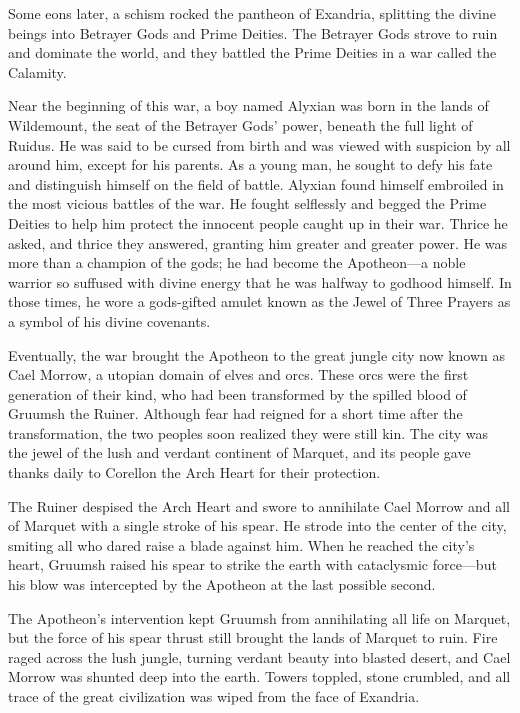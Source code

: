 \documentclass[10pt,a4paper,twoside,twocolumn,openany,nodeprecatedcode]{dndbook}
\begin{document}
Some eons later, a schism rocked the pantheon of Exandria, splitting the divine beings into Betrayer Gods and Prime Deities. The Betrayer Gods strove to ruin and dominate the world, and they battled the Prime Deities in a war called the Calamity.

Near the beginning of this war, a boy named Alyxian was born in the lands of Wildemount, the seat of the Betrayer Gods' power, beneath the full light of Ruidus. He was said to be cursed from birth and was viewed with suspicion by all around him, except for his parents. As a young man, he sought to defy his fate and distinguish himself on the field of battle. Alyxian found himself embroiled in the most vicious battles of the war. He fought selflessly and begged the Prime Deities to help him protect the innocent people caught up in their war. Thrice he asked, and thrice they answered, granting him greater and greater power. He was more than a champion of the gods; he had become the Apotheon—a noble warrior so suffused with divine energy that he was halfway to godhood himself. In those times, he wore a gods-gifted amulet known as the Jewel of Three Prayers as a symbol of his divine covenants.

Eventually, the war brought the Apotheon to the great jungle city now known as Cael Morrow, a utopian domain of elves and orcs. These orcs were the first generation of their kind, who had been transformed by the spilled blood of Gruumsh the Ruiner. Although fear had reigned for a short time after the transformation, the two peoples soon realized they were still kin. The city was the jewel of the lush and verdant continent of Marquet, and its people gave thanks daily to Corellon the Arch Heart for their protection.

The Ruiner despised the Arch Heart and swore to annihilate Cael Morrow and all of Marquet with a single stroke of his spear. He strode into the center of the city, smiting all who dared raise a blade against him. When he reached the city's heart, Gruumsh raised his spear to strike the earth with cataclysmic force—but his blow was intercepted by the Apotheon at the last possible second.

The Apotheon's intervention kept Gruumsh from annihilating all life on Marquet, but the force of his spear thrust still brought the lands of Marquet to ruin. Fire raged across the lush jungle, turning verdant beauty into blasted desert, and Cael Morrow was shunted deep into the earth. Towers toppled, stone crumbled, and all trace of the great civilization was wiped from the face of Exandria.
\end{document}
